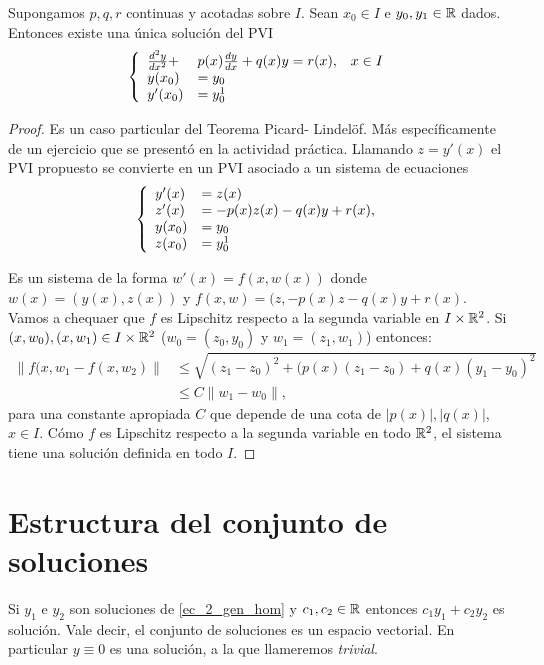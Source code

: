 \begin{teorema}{}
Supongamos $p,q,r$ continuas y acotadas sobre $I$. Sean $x_0\in I$ e $y_0,y_1\in\mathbb{R}$ dados. Entonces existe una única solución del PVI
\[\left\{
\begin{array}{l l l}
\frac{d^2y}{dx^2}+&p(x)\frac{dy}{dx}+q(x)y=r(x),&x\in I\\
y(x_0)&=y_0&\\
y'(x_0)&=y^1_0&\\
\end{array}\right.
\]
\end{teorema}
\begin{proof} Es un caso particular del Teorema Picard- Lindelöf. Más específicamente de un ejercicio que se presentó en la actividad práctica. Llamando $z=y'(x)$ el PVI propuesto se convierte en un PVI asociado a un sistema de ecuaciones
\[\left\{
\begin{array}{l l l}

y'(x)&= z(x)\\
z'(x)&= -p(x)z(x)-q(x)y+r(x),\\
y(x_0)&=y_0\\
z(x_0)&=y^1_0\\
\end{array}\right.
\]

Es un sistema de la forma $w'(x)=f(x,w(x))$ donde $w(x)=(y(x),z(x))$ y $f(x,w)=(z,-p(x)z-q(x)y+r(x)$. Vamos a chequaer que $f$ es Lipschitz respecto a la segunda variable  en $I\times \mathbb{R}^2$. Si $(x,w_0),(x,w_1)\in I\times \mathbb{R}^2$  ($w_0=(z_0,y_0)$ y $w_1=(z_1,w_1)$) entonces:
\[
\begin{split}
  \|f(x,w_1-f(x,w_2)\|&\leq \sqrt{(z_1-z_0)^2+  (p(x)(z_1-z_0)+q(x)(y_1-y_0)^2}\\
  &\leq
 C\|w_1-w_0\|,
\end{split}
\]
para una constante apropiada $C$ que depende de una cota de $|p(x)|,|q(x)|$, $x\in I$.
Cómo $f$ es Lipschitz respecto a la segunda variable en todo $\mathbb{R}^2$, el sistema tiene una solución definida en todo $I$.




\end{proof}


\section{Estructura del conjunto de soluciones}
\begin{teorema}{}
Si $y_1$ e $y_2$ son soluciones de \eqref{ec_2_gen_hom} y $c_1,c_2\in\mathbb{R}$ entonces $c_1y_1+c_2y_2$ es solución. Vale decir, el conjunto de soluciones
es un espacio vectorial. En particular $y\equiv 0$ es una solución, a la que llameremos \emph{trivial}.
\end{teorema}

